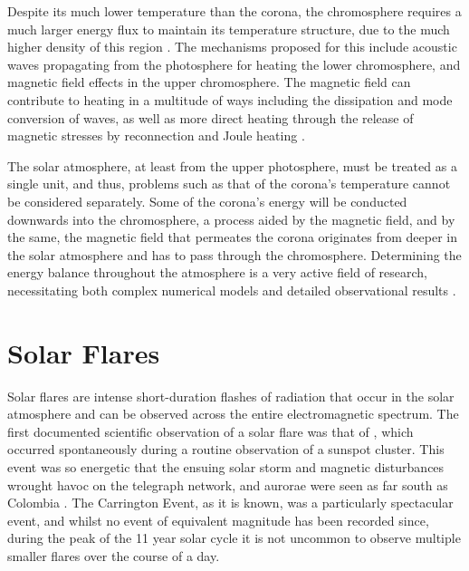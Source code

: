 Despite its much lower temperature than the corona, the chromosphere requires a much larger energy flux to maintain its temperature structure, due to the much higher density of this region \citep{DeMoortel2015,Carlsson2019}.
The mechanisms proposed for this include acoustic waves propagating from the photosphere for heating the lower chromosphere, and magnetic field effects in the upper chromosphere.
The magnetic field can contribute to heating in a multitude of ways including the dissipation and mode conversion of waves, as well as more direct heating through the release of magnetic stresses by reconnection and Joule heating \citep{Carlsson2019}.

The solar atmosphere, at least from the upper photosphere, must be treated as a single unit, and thus, problems such as that of the corona's temperature cannot be considered separately.
Some of the corona's energy will be conducted downwards into the chromosphere, a process aided by the magnetic field, and by the same, the magnetic field that permeates the corona originates from deeper in the solar atmosphere and has to pass through the chromosphere.
Determining the energy balance throughout the atmosphere is a very active field of research, necessitating both complex numerical models and detailed observational results \citep[e.g.][]{Carlsson2019}.

\section{Solar Flares}

Solar flares are intense short-duration flashes of radiation that occur in the solar atmosphere and can be observed across the entire electromagnetic spectrum.
The first documented scientific observation of a solar flare was that of \citet{Carrington1859}, which occurred spontaneously during a routine observation of a sunspot cluster.
This event was so energetic that the ensuing solar storm and magnetic disturbances wrought havoc on the telegraph network, and aurorae were seen as far south as Colombia \citep{MorenoCardenas2016}.
The Carrington Event, as it is known, was a particularly spectacular event, and whilst no event of equivalent magnitude has been recorded since, during the peak of the 11 year solar cycle it is not uncommon to observe multiple smaller flares over the course of a day.

